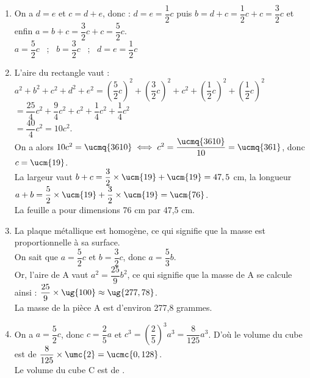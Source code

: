 \ \\ [-5mm]
   \begin{enumerate}
      \item On a $d = e$  et $c = d+e$, donc : $d = e = \dfrac12c$ \; puis \; $b = d + c = \dfrac12c + c = \dfrac32c$ \; et enfin \; $a = b + c = \dfrac32c + c = \dfrac52c$. \\
         {\blue $a = \dfrac52c$ \, ; \, $b = \dfrac32c$ \, ; \, $d = e = \dfrac12c$}
      \smallskip
      \item L'aire du rectangle vaut : \\
         $a^2+b^2+c^2+d^2+e^2 =\left(\dfrac52c\right)^2+\left(\dfrac32c\right)^2+c^2+\left(\dfrac12c\right)^2+\left(\dfrac12c\right)^2$ \\ [1mm]
         \hspace*{3.05cm} $=\dfrac{25}{4}c^2+\dfrac94c^2+c^2+\dfrac14c^2+\dfrac14c^2$ \\ [1mm]
         \hspace*{3.05cm} $=\dfrac{40}{4}c^2=10c^2$. \\
         On a alors $10c^2 =\ucmq{3610} \iff c^2 =\dfrac{\ucmq{3610}}{10} =\ucmq{361}$, donc $c=\ucm{19}$. \\
         La largeur vaut $b+c =\dfrac32\times\ucm{19}+\ucm{19} = 47,5$ cm, la longueur $a+b =\dfrac52\times\ucm{19}+\dfrac32\times\ucm{19}= \ucm{76}$. \\ [1mm]
         {\blue La feuille a pour dimensions 76 cm par 47,5 cm.}
      \item La plaque métallique est homogène, ce qui signifie que la masse est proportionnelle à sa surface. \\
         On sait que $a=\dfrac52c$ et $b=\dfrac32c$, donc $a=\dfrac53b$. \\ [1mm]
         Or, l'aire de A vaut $a^2 =\dfrac{25}{9}b^2$, ce qui signifie que la masse de A se calcule ainsi : $\dfrac{25}{9}\times\ug{100} \approx\ug{277,78}$. \\ [1mm]
         {\blue La masse de la pièce A est d'environ 277,8 grammes.}
      \item On a $a =\dfrac52c$, donc $c=\dfrac25a$ et $c^3=\left(\dfrac25\right)^3a^3 =\dfrac{8}{125}a^3$. D'où le volume du cube est de $\dfrac{8}{125}\times\umc{2} =\ucmc{0,128}$. \\ [1mm]
         {\blue Le volume du cube C est de .}
   \end{enumerate}

